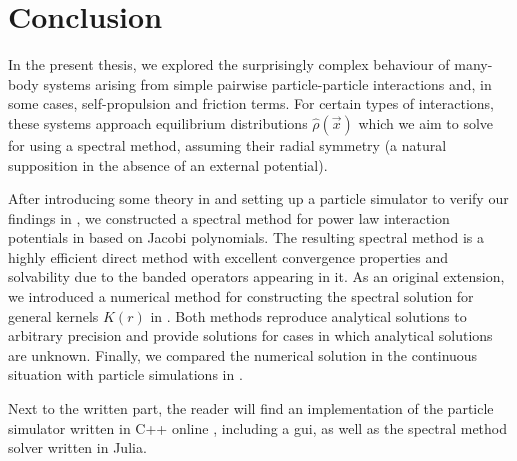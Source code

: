 \chapter{Conclusion}
\label{chap:conclusion}



In the present thesis, we explored the surprisingly complex behaviour of many-body systems arising from simple pairwise particle-particle interactions and, in some cases, self-propulsion and friction terms.
For certain types of interactions, these systems approach equilibrium distributions $\hat{\rho}(\vec{x})$ which we aim to solve for using a spectral method, assuming their radial symmetry (a natural supposition in the absence of an external potential).

After introducing some theory in  and setting up a particle simulator to verify our findings in , we constructed a spectral method for power law interaction potentials in  based on Jacobi polynomials.
The resulting spectral method is a highly efficient direct method with excellent convergence properties and solvability due to the banded operators appearing in it.
As an original extension, we introduced a numerical method for constructing the spectral solution for general kernels $K(r)$ in .
Both methods reproduce analytical solutions to arbitrary precision and provide solutions for cases in which analytical solutions are unknown.
Finally, we compared the numerical solution in the continuous situation with particle simulations in .

Next to the written part, the reader will find an implementation of the particle simulator written in C++ online \parencite{2023-my-dissertation}, including a \gls{gui}, as well as the spectral method solver written in Julia.


